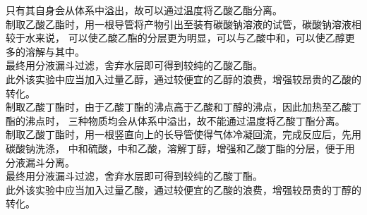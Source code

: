 \documentclass[UTF8]{ctexart}
\begin{document}
    只有其自身会从体系中溢出，故可以通过温度将乙酸乙酯分离。\\[3mm]
    制取乙酸乙酯时，用一根导管将产物引出至装有碳酸钠溶液的试管，碳酸钠溶液相较于水来说，
    可以使乙酸乙酯的分层更为明显，可以与乙酸中和，可以使乙醇更多的溶解与其中。\\[3mm]
    最终用分液漏斗过滤，舍弃水层即可得到较纯的乙酸乙酯。\\[3mm]
    此外该实验中应当加入过量乙醇，通过较便宜的乙醇的浪费，增强较昂贵的乙酸的转化。\\[8mm]
    制取乙酸丁酯时，由于乙酸丁酯的沸点高于乙酸和丁醇的沸点，因此加热至乙酸丁酯的沸点时，
    三种物质均会从体系中溢出，故不能通过温度将乙酸丁酯分离。\\[3mm]
    制取乙酸丁酯时，用一根竖直向上的长导管使得气体冷凝回流，完成反应后，先用碳酸钠洗涤，
    中和硫酸，中和乙酸，溶解丁醇，增强和乙酸丁酯的分层，便于用分液漏斗分离。\\[3mm]
    最终用分液漏斗过滤，舍弃水层即可得到较纯的乙酸丁酯。\\[3mm]
    此外该实验中应当加入过量乙酸，通过较便宜的乙酸的浪费，增强较昂贵的丁醇的转化。

\newpage
\end{document}
